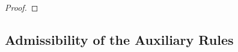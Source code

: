 \documentclass[runningheads]{llncs}       %
\begin{document}
\begin{proof}


\end{proof}



\subsection{Admissibility of the Auxiliary Rules}
\label{subsec:proof-admissibility}
\end{document}

